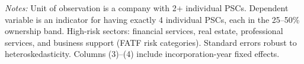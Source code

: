 \begin{table}[htbp]
   \par \raggedright 
   \textit{Notes:} Unit of observation is a company with 2+ individual PSCs. Dependent variable is an indicator for having exactly 4 individual PSCs, each in the 25--50\% ownership band. High-risk sectors: financial services, real estate, professional services, and business support (FATF risk categories). Standard errors robust to heteroskedasticity. Columns (3)--(4) include incorporation-year fixed effects.
\end{table}


